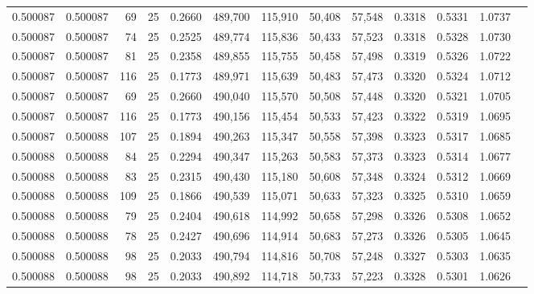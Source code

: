 \begin{tabular}{rrrrrrrrrrrrr}
0.500087 & 0.500087 &    69 &  25 &                                     0.2660 & 489,700 & 115,910 &  50,408 &  57,548 & 0.3318 & 0.5331 & 1.0737 \\
0.500087 & 0.500087 &    74 &  25 &                                     0.2525 & 489,774 & 115,836 &  50,433 &  57,523 & 0.3318 & 0.5328 & 1.0730 \\
0.500087 & 0.500087 &    81 &  25 &                                     0.2358 & 489,855 & 115,755 &  50,458 &  57,498 & 0.3319 & 0.5326 & 1.0722 \\
0.500087 & 0.500087 &   116 &  25 &                                     0.1773 & 489,971 & 115,639 &  50,483 &  57,473 & 0.3320 & 0.5324 & 1.0712 \\
0.500087 & 0.500087 &    69 &  25 &                                     0.2660 & 490,040 & 115,570 &  50,508 &  57,448 & 0.3320 & 0.5321 & 1.0705 \\
0.500087 & 0.500087 &   116 &  25 &                                     0.1773 & 490,156 & 115,454 &  50,533 &  57,423 & 0.3322 & 0.5319 & 1.0695 \\
0.500087 & 0.500088 &   107 &  25 &                                     0.1894 & 490,263 & 115,347 &  50,558 &  57,398 & 0.3323 & 0.5317 & 1.0685 \\
0.500088 & 0.500088 &    84 &  25 &                                     0.2294 & 490,347 & 115,263 &  50,583 &  57,373 & 0.3323 & 0.5314 & 1.0677 \\
0.500088 & 0.500088 &    83 &  25 &                                     0.2315 & 490,430 & 115,180 &  50,608 &  57,348 & 0.3324 & 0.5312 & 1.0669 \\
0.500088 & 0.500088 &   109 &  25 &                                     0.1866 & 490,539 & 115,071 &  50,633 &  57,323 & 0.3325 & 0.5310 & 1.0659 \\
0.500088 & 0.500088 &    79 &  25 &                                     0.2404 & 490,618 & 114,992 &  50,658 &  57,298 & 0.3326 & 0.5308 & 1.0652 \\
0.500088 & 0.500088 &    78 &  25 &                                     0.2427 & 490,696 & 114,914 &  50,683 &  57,273 & 0.3326 & 0.5305 & 1.0645 \\
0.500088 & 0.500088 &    98 &  25 &                                     0.2033 & 490,794 & 114,816 &  50,708 &  57,248 & 0.3327 & 0.5303 & 1.0635 \\
0.500088 & 0.500088 &    98 &  25 &                                     0.2033 & 490,892 & 114,718 &  50,733 &  57,223 & 0.3328 & 0.5301 & 1.0626 \\

\end{tabular}
